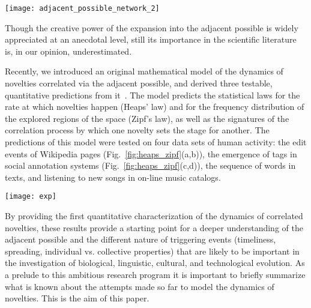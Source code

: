 \documentclass[graybox]{svmult}
\begin{document}
\begin{figure*}[t]
\centering
\texttt{[image: adjacent\_possible\_network\_2]}
\caption{Mathematical illustration of the adjacent possible in terms of a graph that conditionally expands from the situation depicted in (a) to that depicted in (b) whenever a walker visits a node for the first time (the white node in (a)).
\label{fig:adjacent_possible_network}
}
\end{figure*}

Though the creative power of the expansion into the adjacent possible is widely appreciated at an anecdotal level, still its importance in the scientific literature~\cite{kauffman_2000,kauffman_2008,thurner_2010,Sole_2013,Felin_2014,buchanan_2014} is, in our opinion, underestimated. 

Recently, we introduced an original mathematical model of the dynamics of novelties correlated via the adjacent possible, and derived three testable, quantitative predictions from it~\cite{adjacent_possible_2014}. The model predicts the statistical laws for the rate at which novelties happen (Heaps' law) and for the frequency distribution of the explored regions of the space (Zipf's law), as well as the signatures of the correlation process by which one novelty sets the stage for another. The predictions of this model were tested on four data sets of human activity: the edit events of Wikipedia pages (Fig.~\ref{fig:heaps_zipf}(a,b)), the emergence of tags in social annotation systems (Fig.~\ref{fig:heaps_zipf}(c,d)), the sequence of words in texts, and listening to new songs in on-line music catalogs. 

\begin{figure*}[t]
\centering
\texttt{[image: exp]}
\caption{{\bf Heaps' law (a-c) and Zipf's law (b-d) in real datasets.} Gutenberg~\cite{gutenberg} {\bf (a,b)},  del.icio.us~\cite{delicious} {\bf (c,d)} datasets.  Straight lines in the Heaps' law plots show functions of the form $f(x)=a x^{\gamma}$, with the exponent $\gamma$ equal respectively to $\gamma=0.45$ (Gutenberg) and $\gamma=0.78$ (del.icio.us). Straight lines in the Zipf's law plots show functions of the form $f(x)=a x^{-\alpha}$, where the exponent $\alpha$ is equal to $\gamma^{-1}$ for the different $\gamma$'s considered above.}
  \label{fig:heaps_zipf}
\end{figure*}

By providing the first quantitative characterization of the dynamics of correlated novelties, these results provide a starting point for a deeper understanding of the adjacent possible and the different nature of triggering events (timeliness, spreading, individual vs. collective properties) that are likely to be important in the investigation of biological, linguistic, cultural, and technological evolution. As a prelude to this ambitious research program it is important to briefly summarize what is known about the attempts made so far  to model the dynamics of novelties. This is the aim of this paper.
\end{document}
